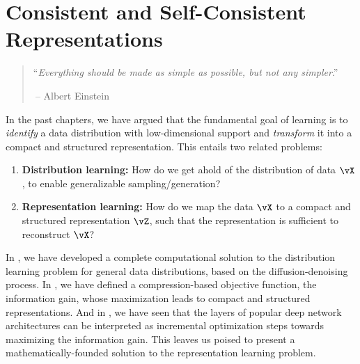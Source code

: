 \documentclass[../../book-main.tex]{subfiles}
\begin{document}
\chapter{Consistent and Self-Consistent Representations}
\label{ch:consistent-representations}

\begin{quote}
    \hfill  ``{\em Everything should be made as simple as possible,
    but not any simpler}.''

    $~$\hfill -- Albert Einstein
\end{quote}

\vspace{5mm}

In the past chapters, we have argued that the fundamental goal of learning is to
\textit{identify} a data distribution with low-dimensional support and
\textit{transform} it into a compact and structured representation. This entails
two related problems:
\begin{enumerate}
    \item \textbf{Distribution learning:} How do we get ahold of the
        distribution
        of data $\vX$, to enable generalizable sampling/generation?
    \item \textbf{Representation learning:} How do we map the data $\vX$ to
        a compact and structured representation $\vZ$, such that the
        representation
        is sufficient to reconstruct $\vX$?
\end{enumerate}
In , we have developed a complete
computational solution to
the distribution learning problem for general data distributions, based on the
diffusion-denoising process. %
In , we have defined a
compression-based objective
function, the information gain, whose maximization leads to compact and
structured representations.
And in , we have seen that the layers of popular deep
network architectures can be interpreted as incremental optimization steps
towards maximizing the information gain. This leaves us poised to present
a mathematically-founded solution to the representation learning problem.
\end{document}
